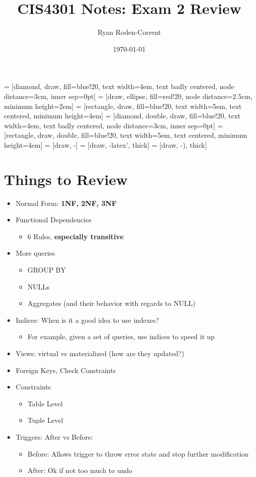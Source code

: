 \documentclass[12pt]{article}
\title{CIS4301 Notes: Exam 2 Review}
\author{Ryan Roden-Corrent}
\date{\today}
\begin{document}
\setlength\parindent{0pt}
 = [diamond, draw, fill=blue!20, text width=4em,
  text badly centered, node distance=3cm, inner sep=0pt]
 = [draw, ellipse, fill=red!20, node distance=2.5cm,
  minimum height=2em]
 = [rectangle, draw, fill=blue!20, text width=5em,
  text centered, minimum height=4em]
 = [diamond, double, draw, fill=blue!20, text width=4em,
  text badly centered, node distance=3cm, inner sep=0pt]
 = [rectangle, draw, double, fill=blue!20, text width=5em,
  text centered, minimum height=4em]
 = [draw, -]
 = [draw, -latex', thick]
 = [draw, -), thick]
\maketitle

\section{Things to Review}
\begin{itemize}
  \item {Normal Form: \textbf{1NF, 2NF, 3NF}}
  \item {Functional Dependencies
      \begin{itemize}
        \item {6 Rules, \textbf{especially transitive}}
      \end{itemize}
    }
  \item {More queries
      \begin{itemize}
        \item {GROUP BY}
        \item {NULLs}
        \item {Aggregates (and their behavior with regards to NULL)}
      \end{itemize}
    }
  \item {Indices: When is it a good idea to use indexes?
      \begin{itemize}
        \item {For example, given a set of queries, use indices to speed it up}
      \end{itemize}
    }
  \item {Views: virtual vs materialized (how are they updated?)}
  \item {Foreign Keys, Check Constraints}
  \item {Constraints
      \begin{itemize}
        \item {Table Level}
        \item {Tuple Level}
      \end{itemize}
    }
  \item {Triggers: After vs Before:
    \begin{itemize}
      \item {Before: Allows trigger to throw error state and stop further
          modification}
      \item {After: Ok if not too much to undo}
    \end{itemize}
  }
\end{itemize}
\end{document}
